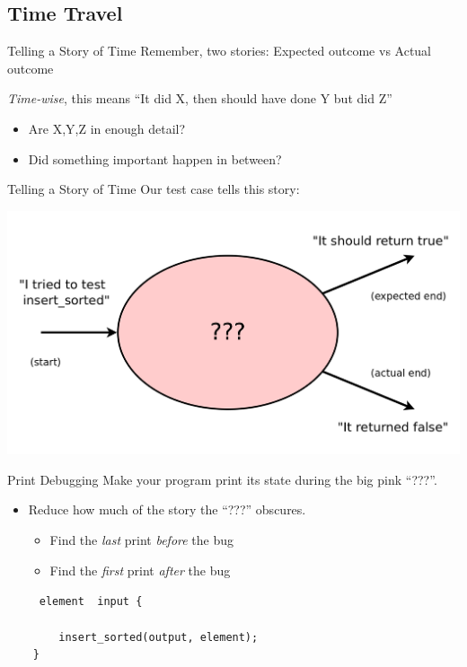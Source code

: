 \documentclass[xcolor=dvipsnames]{beamer}
\begin{document}
\subsection{Time Travel}


\begin{frame}{Telling a Story of Time}
	Remember, two stories: Expected outcome vs Actual outcome

	\linegap
	{\em Time-wise}, this means ``It did X, then should have done Y but did Z''
	\begin{itemize}
		\item Are X,Y,Z in enough detail?
		\item Did something important happen in between?
	\end{itemize}
\end{frame}

\begin{frame}{Telling a Story of Time}
	Our test case tells this story:

	\includegraphics[width=\textwidth]{time0.png}
\end{frame}

\begin{frame}{Print Debugging}
	Make your program print its state during the big pink ``???''.
	\begin{itemize}
		\item Reduce how much of the story the ``???'' obscures.
		\begin{itemize}
			\item Find the {\em last} print {\em before} the bug
			\item Find the {\em first} print {\em after} the bug
		\end{itemize}
	\end{itemize}
	\pause

	\linegap
		\texttt{~~~~~element~~input~\{} \\
		\texttt{~~~~~~~~} \\
		\texttt{~~~~~~~~insert\_sorted(output,~element);} \\
		\texttt{~~~~\}} \\

\end{frame}
\end{document}
